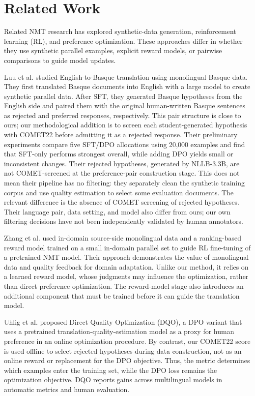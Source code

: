 \documentclass[conference]{IEEEtran}
\begin{document}
\section{Related Work}
Related NMT research has explored synthetic-data generation, reinforcement learning (RL), and preference optimization. These approaches differ in whether they use synthetic parallel examples, explicit reward models, or pairwise comparisons to guide model updates.

Luu et al. \cite{b5} studied English-to-Basque translation using monolingual Basque data. They first translated Basque documents into English with a large model to create synthetic parallel data. After SFT, they generated Basque hypotheses from the English side and paired them with the original human-written Basque sentences as rejected and preferred responses, respectively. This pair structure is close to ours; our methodological addition is to screen each student-generated hypothesis with COMET22 before admitting it as a rejected response. Their preliminary experiments compare five SFT/DPO allocations using 20,000 examples and find that SFT-only performs strongest overall, while adding DPO yields small or inconsistent changes. Their rejected hypotheses, generated by NLLB-3.3B, are not COMET-screened at the preference-pair construction stage. This does not mean their pipeline has no filtering: they separately clean the synthetic training corpus and use quality estimation to select some evaluation documents. The relevant difference is the absence of COMET screening of rejected hypotheses. Their language pair, data setting, and model also differ from ours; our own filtering decisions have not been independently validated by human annotators.

Zhang et al. \cite{b6} used in-domain source-side monolingual data and a ranking-based reward model trained on a small in-domain parallel set to guide RL fine-tuning of a pretrained NMT model. Their approach demonstrates the value of monolingual data and quality feedback for domain adaptation. Unlike our method, it relies on a learned reward model, whose judgments may influence the optimization, rather than direct preference optimization. The reward-model stage also introduces an additional component that must be trained before it can guide the translation model.

Uhlig et al. \cite{b7} proposed Direct Quality Optimization (DQO), a DPO variant that uses a pretrained translation-quality-estimation model as a proxy for human preference in an online optimization procedure. By contrast, our COMET22 score is used offline to select rejected hypotheses during data construction, not as an online reward or replacement for the DPO objective. Thus, the metric determines which examples enter the training set, while the DPO loss remains the optimization objective. DQO reports gains across multilingual models in automatic metrics and human evaluation.
\end{document}
